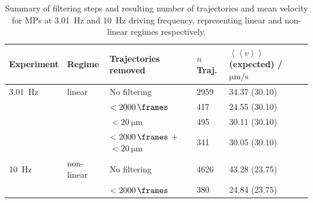 \begin{table}[htb]
\caption{Summary of filtering steps and resulting number of trajectories and mean velocity for  MPs at \SI{3.01}{\Hz} and \SI{10}{\Hz} driving frequency, representing linear and non-linear regimes respectively.}
\label{Table:filtering_summary}
\begin{tabular}{l|l|l|l|l}
Experiment    & Regime     & Trajectories removed                       & $n$ Traj.    & $\left<\left< v \right>\right>$ (expected) / $\si{\micro\m\per\s}$ \\ \hline
\SI{3.01}{\Hz}& linear     & No filtering                               & 2959              & 34.37 (30.10)\\
              &            & $<\SI{2000}{\frames}$                      & 417               & 24.55 (30.10)\\
              &            & $<\SI{20}{\micro\m}$                       & 495               & 30.11 (30.10)\\
              &            & $<\SI{2000}{\frames}$ + $<\SI{20}{\micro\m}$ & 341             & 30.05 (30.10)\\ \hline
\SI{10}{\Hz}  & non-linear & No filtering                               & 4626              & 43.28 (23.75)\\
              &            & $<\SI{2000}{\frames}$                      & 380               & 24.84 (23.75)                       
\end{tabular}
\end{table}